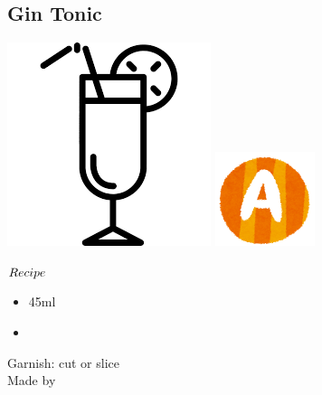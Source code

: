 \subsection{Gin Tonic}
\vspace{-7.6mm}
\hspace{36mm}
\includegraphics[scale=.07]{cocktail_glass_tall.png}
\includegraphics[scale=.12]{capital_a.png}
\vspace{2.5mm}
\begin{itembox}[l]{\boldmath $Recipe$}
\begin{itemize}
\setlength{\parskip}{0cm}
\setlength{\itemsep}{0cm}
\item \gin 45ml
\item \tw
\end{itemize}
\vspace{-4mm}
Garnish: \lime cut or slice\\
Made by \build
\end{itembox}
